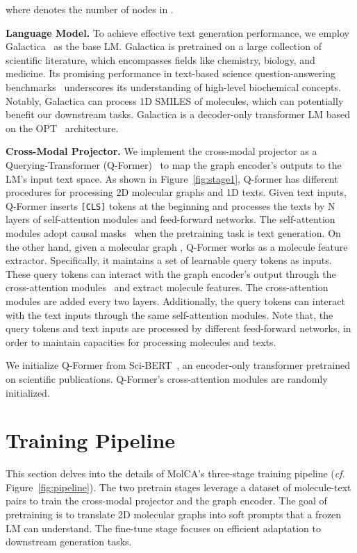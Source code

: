 \documentclass[11pt]{article}
\newcommand{\cf}{\emph{cf. }}
\begin{document}
where  denotes the number of nodes in .

\textbf{Language Model.} To achieve effective text generation performance, we employ Galactica~\citep{Galactica} as the base LM. Galactica is pretrained on a large collection of scientific literature, which encompasses fields like chemistry, biology, and medicine. Its promising performance in text-based science question-answering benchmarks~\citep{MMLU, PubMedQA} underscores its understanding of high-level biochemical concepts. Notably, Galactica can process 1D SMILES of molecules, which can potentially benefit our downstream tasks. Galactica is a decoder-only transformer LM based on the OPT~\citep{OPT} architecture. 





\textbf{Cross-Modal Projector.} 
We implement the cross-modal projector as a Querying-Transformer (Q-Former)~\citep{BLIP2} to map the graph encoder's outputs to the LM's input text space. 
As shown in Figure~\ref{fig:stage1}, Q-former has different procedures for processing 2D molecular graphs and 1D texts. Given text inputs, Q-Former inserts \texttt{[CLS]} tokens at the beginning and processes the texts by N layers of self-attention modules and feed-forward networks. The self-attention modules adopt causal masks~\citep{T5} when the pretraining task is text generation. On the other hand, given a molecular graph , Q-Former works as a molecule feature extractor. Specifically, it maintains a set of learnable query tokens  as inputs. These query tokens can interact with the graph encoder's output  through the cross-attention modules~\citep{Transformer} and extract molecule features. The cross-attention modules are added every two layers. Additionally, the query tokens can interact with the text inputs through the same self-attention modules. Note that, the query tokens and text inputs are processed by different feed-forward networks, in order to maintain capacities for processing molecules and texts.


We initialize Q-Former from Sci-BERT~\citep{SciBERT}, an encoder-only transformer pretrained on scientific publications. 
Q-Former's cross-attention modules are randomly initialized.

\section{Training Pipeline}
This section delves into the details of MolCA's three-stage training pipeline (\cf Figure~\ref{fig:pipeline}). The two pretrain stages leverage a dataset of molecule-text pairs  to train the cross-modal projector and the graph encoder. The goal of pretraining is to translate 2D molecular graphs into soft prompts that a frozen LM can understand. The fine-tune stage focuses on efficient adaptation to downstream generation tasks.
\end{document}
